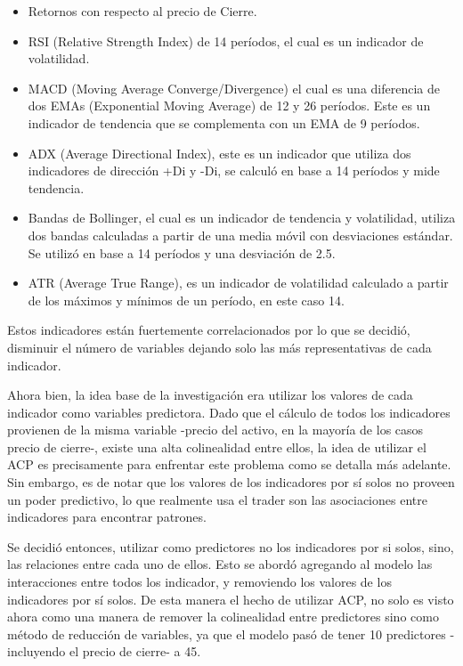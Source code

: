 \documentclass[a4paper,12pt]{Latex/Classes/PhDthesisPSnPDF}
\begin{document}
\begin{itemize}
\item Retornos con respecto al precio de Cierre.
\item RSI (Relative Strength Index) de 14 períodos, el cual es un indicador de volatilidad.
\item MACD (Moving Average Converge/Divergence) el cual es una diferencia de dos EMAs (Exponential Moving Average) de 12 y 26 períodos. Este es un indicador de tendencia que se complementa con un EMA de 9 períodos. 
\item ADX (Average Directional Index), este es un indicador que utiliza dos indicadores de dirección +Di y -Di, se calculó en base a 14 períodos y mide tendencia.
\item Bandas de Bollinger, el cual es un indicador de tendencia y volatilidad, utiliza dos bandas calculadas a partir de una media móvil con desviaciones estándar. Se utilizó en base a 14 períodos y una desviación de 2.5.
\item ATR (Average True Range), es un indicador de volatilidad calculado a partir de los máximos y mínimos de un período, en este caso 14.
\end{itemize}

Estos indicadores están fuertemente correlacionados por lo que se decidió, disminuir el número de variables dejando solo las más representativas de cada indicador.

Ahora bien, la idea base de la investigación era utilizar los valores de cada indicador como variables predictora. Dado que el cálculo de todos los indicadores provienen de la misma variable -precio del activo, en la mayoría de los casos precio de cierre-, existe una alta colinealidad entre ellos, la idea de utilizar el ACP es precisamente para enfrentar este problema como se detalla más adelante. Sin embargo, es de notar que los valores de los indicadores por sí solos no proveen un poder predictivo, lo que realmente usa el trader son las asociaciones entre indicadores para encontrar patrones. 

Se decidió entonces, utilizar como predictores no los indicadores por si solos, sino, las relaciones entre cada uno de ellos. Esto se abordó agregando al modelo las interacciones entre todos los indicador, y removiendo los valores de los indicadores por sí solos. De esta manera el hecho de utilizar ACP, no solo es visto ahora como una manera de remover la colinealidad entre predictores sino como método de reducción de variables, ya que el modelo pasó de tener 10 predictores -incluyendo el precio de cierre- a 45.
\end{document}
